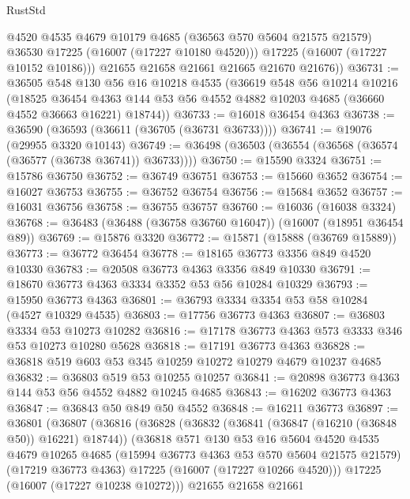 \begin{lexlean}{RustStd}
\begin{coremodule}
            @4520
            @4535
            @4679
            @10179
            @4685
            (@36563 @570 @5604 @21575 @21579)
            @36530
            @17225
            (@16007 (@17227 @10180 @4520)))
          @17225
          (@16007 (@17227 @10152 @10186)))
        @21655
        @21658
        @21661
        @21665
        @21670
        @21676))
@36731 := @36505
    @548
    @130
    @56
    @16
    @10218
    @4535
    (@36619
      @548
      @56
      @10214
      @10216
      (@18525
        @36454
        @4363
        @144
        @53
        @56
        @4552
        @4882
        @10203
        @4685
        (@36660 @4552 @36663 @16221)
        @18744))
@36733 := @16018 @36454 @4363
@36738 := @36590 (@36593 (@36611 (@36705 (@36731 @36733))))
@36741 := @19076 (@29955 @3320 @10143)
@36749 := @36498 (@36503 (@36554 (@36568 (@36574 (@36577 (@36738 @36741)) @36733))))
@36750 := @15590 @3324
@36751 := @15786 @36750
@36752 := @36749 @36751
@36753 := @15660 @3652
@36754 := @16027 @36753
@36755 := @36752 @36754
@36756 := @15684 @3652
@36757 := @16031 @36756
@36758 := @36755 @36757
@36760 := @16036 (@16038 @3324)
@36768 := @36483 (@36488 (@36758 @36760 @16047)) (@16007 (@18951 @36454 @89))
@36769 := @15876 @3320
@36772 := @15871 (@15888 (@36769 @15889))
@36773 := @36772 @36454
@36778 := @18165 @36773 @3356 @849 @4520 @10330
@36783 := @20508 @36773 @4363 @3356 @849 @10330
@36791 := @18670 @36773 @4363 @3334 @3352 @53 @56 @10284 @10329
@36793 := @15950 @36773 @4363
@36801 := @36793 @3334 @3354 @53 @58 @10284 (@4527 @10329 @4535)
@36803 := @17756 @36773 @4363
@36807 := @36803 @3334 @53 @10273 @10282
@36816 := @17178 @36773 @4363 @573 @3333 @346 @53 @10273 @10280 @5628
@36818 := @17191 @36773 @4363
@36828 := @36818 @519 @603 @53 @345 @10259 @10272 @10279 @4679 @10237 @4685
@36832 := @36803 @519 @53 @10255 @10257
@36841 := @20898 @36773 @4363 @144 @53 @56 @4552 @4882 @10245 @4685
@36843 := @16202 @36773 @4363
@36847 := @36843 @50 @849 @50 @4552
@36848 := @16211 @36773
@36897 := @36801
    (@36807
      (@36816
        (@36828
          (@36832 (@36841 (@36847 (@16210 (@36848 @50)) @16221) @18744))
          (@36818
            @571
            @130
            @53
            @16
            @5604
            @4520
            @4535
            @4679
            @10265
            @4685
            (@15994 @36773 @4363 @53 @570 @5604 @21575 @21579)
            (@17219 @36773 @4363)
            @17225
            (@16007 (@17227 @10266 @4520)))
          @17225
          (@16007 (@17227 @10238 @10272)))
        @21655
        @21658
        @21661

\end{coremodule}
\end{lexlean}
